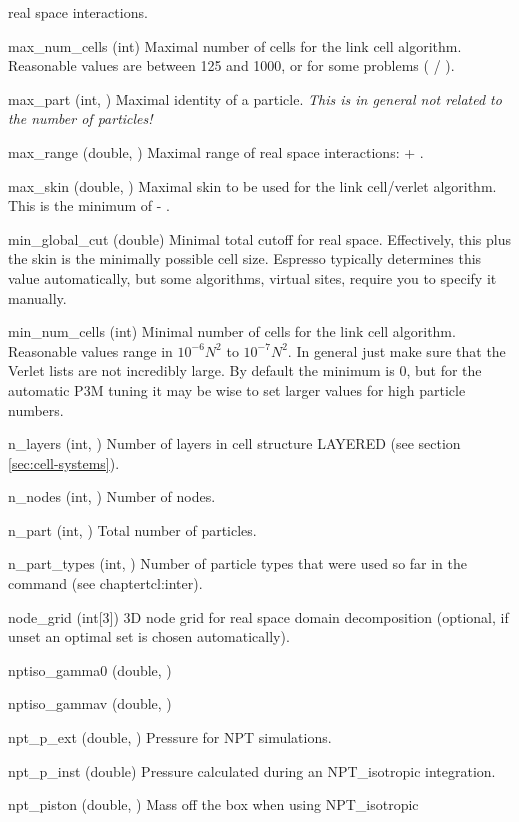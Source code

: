 \begin{globvar}
  real space interactions.
\item[max_num_cells] (int) Maximal number of cells for the link cell
  algorithm.  Reasonable values are between 125 and 1000, or for some
  problems ( / ).
\item[max_part] (int, \ro) Maximal identity of a particle.
  \emph{This is in general not related to the number of particles!}
\item[max_range] (double, \ro) Maximal range of real space
  interactions:  + .
\item[max_skin] (double, \ro) Maximal skin to be used for the link
  cell/verlet algorithm. This is the minimum of  -
  .
\item[min_global_cut] (double) Minimal total cutoff for real space.
  Effectively, this plus the skin is the minimally possible cell size.
  Espresso typically determines this value automatically, but some
  algorithms, \eg{} virtual sites, require you to specify it manually.
\item[min_num_cells] (int) Minimal number of cells for the link cell
  algorithm. Reasonable values range in $10^{-6} N^2$ to $10^{-7}
  N^2$. In general just make sure that the Verlet lists are not
  incredibly large. By default the minimum is 0, but for the automatic
  P3M tuning it may be wise to set larger values for high particle
  numbers.
\item[n_layers] (int, \ro) Number of layers in cell structure LAYERED
  (see section \vref{sec:cell-systems}).
\item[n_nodes] (int, \ro) Number of nodes.
\item[n_part] (int, \ro) Total number of particles.
\item[n_part_types] (int, \ro) Number of particle types that were
  used so far in the  command (see chapter{tcl:inter}).
\item[node_grid] (int[3]) 3D node grid for real space domain
  decomposition (optional, if unset an optimal set is chosen
  automatically).
\item[nptiso_gamma0] (double, \ro)
\item[nptiso_gammav] (double, \ro)
\item[npt_p_ext] (double, \ro) Pressure for NPT simulations.
\item[npt_p_inst] (double) Pressure calculated during an
  NPT_isotropic integration.
\item[npt_piston] (double, \ro) Mass off the box when using NPT_isotropic

\end{globvar}
